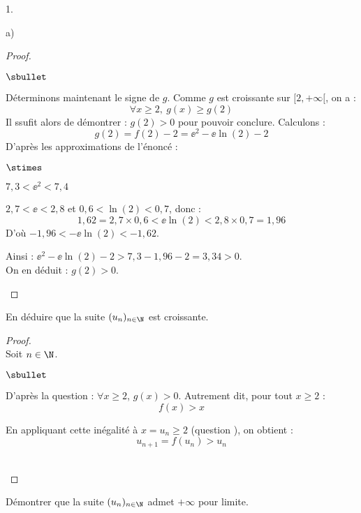 \documentclass[11pt]{article}%
\begin{document}
\begin{noliste}{1.}
\begin{noliste}{a)}
\begin{proof}
\begin{noliste}{$\sbullet$}
      
      \item Déterminons maintenant le signe de $g$. Comme $g$ est
        croissante sur $[2, +\infty[$, on a :
        \[
        \forall x\geq 2, \ g(x) \geq g(2)
        \] 
        Il ssufit alors de démontrer : $g(2) > 0$ pour pouvoir
        conclure. Calculons : 
        \[
        g(2) = f(2)-2 = \ee^2 - \ee\ln(2) - 2
        \]
        D'après les approximations de l'énoncé :
        \begin{noliste}{$\stimes$}
	\item $7,3 < \ee^2 < 7,4$
	\item $2,7 < \ee < 2,8$ et $0,6 < \ln(2) < 0,7$, donc :
          \[
          1,62=2,7\times 0,6 < \ee \ln(2) < 2,8\times 0,7=1,96
          \]
          D'où $-1,96<-\ee\ln(2) <-1,62$.
        \end{noliste}
        Ainsi : $\ee^2 -\ee\ln(2)-2 > 7,3-1,96-2 = 3,34 > 0$.\\
        On en déduit : $g(2)>0$.%
        \conc{$\forall x\in [2,+\infty[$, $g(x)>0$}~\\[-1.4cm]
      \end{noliste}
    \end{proof}
    
  \item En déduire que la suite $(u_n)_{n\in\N}$ est croissante.
	
    \begin{proof}~\\
      Soit $n \in \N$.
      \begin{noliste}{$\sbullet$}
      \item D'après la question  : $\forall x \geq 2$,
        $g(x)>0$. Autrement dit, pour tout $x \geq 2$ :
        \[
        f(x) > x
        \]
      \item En appliquant cette inégalité à $x = u_n \geq 2$ (question
        ), on obtient : 
        \[
        u_{n+1} = f(u_n) > u_n
        \]
      \end{noliste}
      ~\\[-1.2cm]
    \end{proof}
  \end{noliste}
  
  
\item Démontrer que la suite $(u_n)_{n\in\N}$ admet $+\infty$ pour 
  limite.
  

\end{noliste}
\end{document}
